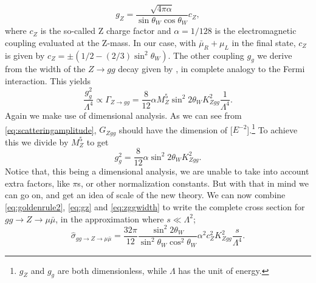 \begin{equation} \label{eq:gz}
	g_Z = \frac{\sqrt{4\pi\alpha}}{\sin{\theta_W}\cos{\theta_W}} c_Z,
\end{equation}
where $c_Z$ is the so-called Z charge factor and $\alpha = 1/128$ is the electromagnetic coupling evaluated at the Z-mass. In our case, with $\bar \mu_R + \mu_L$ in the final state, $c_Z$ is given by $c_Z = \pm (1/2 - (2/3)\sin^2{\theta_W})$. The other coupling $g_g$ we derive from the width of the $Z \rightarrow gg$ decay given by \cite{behr2003dnc}, in complete analogy to the Fermi interaction. This yields
\begin{equation} \label{eq:zggwidth}
	\frac{g_g^2}{\Lambda^4} \propto \Gamma_{Z \rightarrow gg} = \frac{8}{12} \alpha M_Z^5 \sin^2{2\theta_W} K_{Zgg}^2 \frac{1}{\Lambda^4}.
\end{equation}
Again we make use of dimensional analysis. As we can see from \eqref{eq:scatteringamplitude}, $G_{Zgg}$ should have the dimension of [$E^{-2}$].\footnote{$g_Z$ and $g_g$ are both dimensionless, while $\Lambda$ has the unit of energy.} To achieve this we divide by $M_Z^5$ to get
\begin{equation}
	g_g^2 = \frac{8}{12} \alpha \sin^2{2\theta_W} K_{Zgg}^2.
\end{equation}
Notice that, this being a dimensional analysis, we are unable to take into account extra factors, like $\pi$s, or other normalization constants. But with that in mind we can go on, and get an idea of scale of the new theory. We can now combine \eqref{eq:goldenrule2}, \eqref{eq:gz} and \eqref{eq:zggwidth} to write the complete cross section for $gg \rightarrow Z \rightarrow \mu \bar \mu$, in the approximation where $s \ll \Lambda^2$;
\begin{equation} \label{eq:sigmahatgg}
	\hat \sigma_{gg \rightarrow Z \rightarrow \mu \bar \mu} = \frac{32\pi}{12} \frac{\sin^2{2\theta_W}}{\sin^2{\theta_W}\cos^2{\theta_W}} \alpha^2 c_Z^2 K_{Zgg}^2 \frac{s}{\Lambda^4}.
\end{equation}

